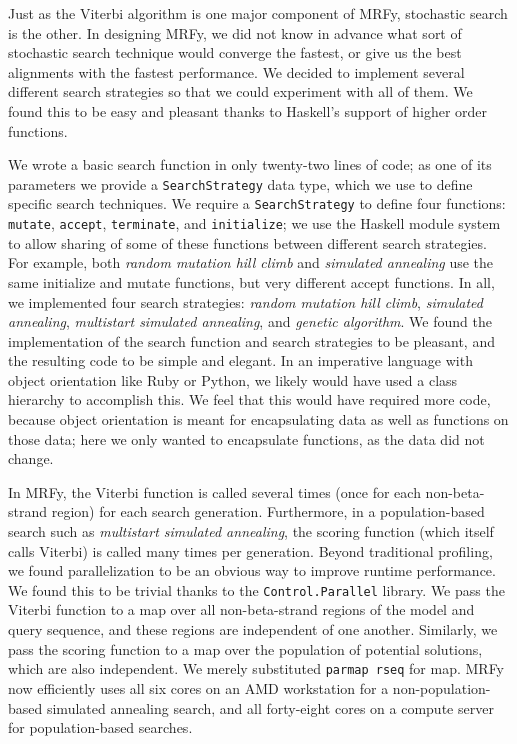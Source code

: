 \documentclass[preprint]{sigplanconf}
\begin{document}
\begin{figure*}

\end{figure*}

Just as the Viterbi algorithm is one major component of MRFy, stochastic search 
is the other. In designing MRFy, we did not know in advance what sort of 
stochastic search technique would converge the fastest, or give us the best 
alignments with the fastest performance. We decided to implement several 
different search strategies so that we could experiment with all of them. We 
found this to be easy and pleasant thanks to Haskell's support of higher order 
functions.

We wrote a basic search function in only twenty-two lines of code; as one of 
its parameters we provide a \texttt{SearchStrategy} data type, which we use to 
define specific search techniques. We require a \texttt{SearchStrategy} to 
define four functions: \texttt{mutate}, \texttt{accept}, \texttt{terminate}, 
and \texttt{initialize}; we use the Haskell module system to allow sharing of 
some of these functions between different search strategies. For example, both 
\textit{random mutation hill climb} and \textit{simulated annealing} use the 
same initialize and mutate functions, but very different accept functions. In 
all, we implemented four search strategies: \textit{random mutation hill 
climb}, \textit{simulated annealing}, \textit{multistart simulated annealing}, 
and \textit{genetic algorithm}. We found the implementation of the search 
function and search strategies to be pleasant, and the resulting code to be 
simple and elegant. In an imperative language with object orientation like Ruby 
or Python, we likely would have used a class hierarchy to accomplish this. We 
feel that this would have required more code, because object orientation is 
meant for encapsulating data as well as functions on those data; here we only 
wanted to encapsulate functions, as the data did not change.


\begin{figure*}

\end{figure*}

In MRFy, the Viterbi function is called several times (once for each 
non-beta-strand region) for each search generation. Furthermore, in a 
population-based search such as \textit{multistart simulated annealing}, the 
scoring function (which itself calls Viterbi) is called many times per 
generation. Beyond traditional profiling, we found parallelization to be an 
obvious way to improve runtime performance. We found this to be trivial thanks 
to the \texttt{Control.Parallel} library. We pass the Viterbi function to a map over all 
non-beta-strand regions of the model and query sequence, and these regions are 
independent of one another. Similarly, we pass the scoring function to a map 
over the population of potential solutions, which are also independent. We 
merely substituted \texttt{parmap rseq} for map. MRFy now efficiently uses all six 
cores on an AMD workstation for a non-population-based simulated annealing 
search, and all forty-eight cores on a compute server for population-based 
searches.
\end{document}
